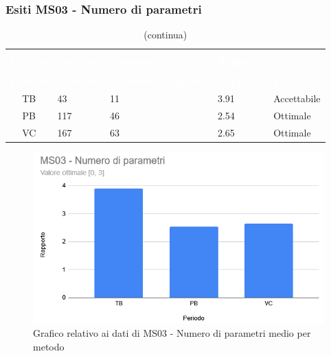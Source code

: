 \subsubsection{Esiti MS03 - Numero di parametri}
\begin{longtable}{c C{2cm} C{3cm} C{2cm} C{2.5cm}}
\caption{Esiti MS03 - Numero di parametri} \\
	\textcolor{white}{\textbf{Periodo}} &
	\textcolor{white}{\textbf{\#metodi}} &
	\textcolor{white}{\textbf{\#parametri}} &
\textcolor{white}{\textbf{Rapporto}} &
\textcolor{white}{\textbf{Esito}} \\
	\endfirsthead
		\caption[]{(continua)} \\
		\textcolor{white}{\textbf{Periodo}} &
	\textcolor{white}{\textbf{\#metodi}} &
	\textcolor{white}{\textbf{\#parametri\_passati}} &
\textcolor{white}{\textbf{Rapporto}} &
\textcolor{white}{\textbf{Esito}} \\
	\endhead
	TB & 43 & 11 & 3.91 & Accettabile \\
	PB & 117 & 46 & 2.54 & Ottimale \\
	VC & 167 & 63 & 2.65 & Ottimale \\
\end{longtable}

\begin{figure}[H]
\centering
\includegraphics[scale=0.7]{./img/MS03.png}
\caption{Grafico relativo ai dati di MS03 - Numero di parametri medio per metodo}
\end{figure}

